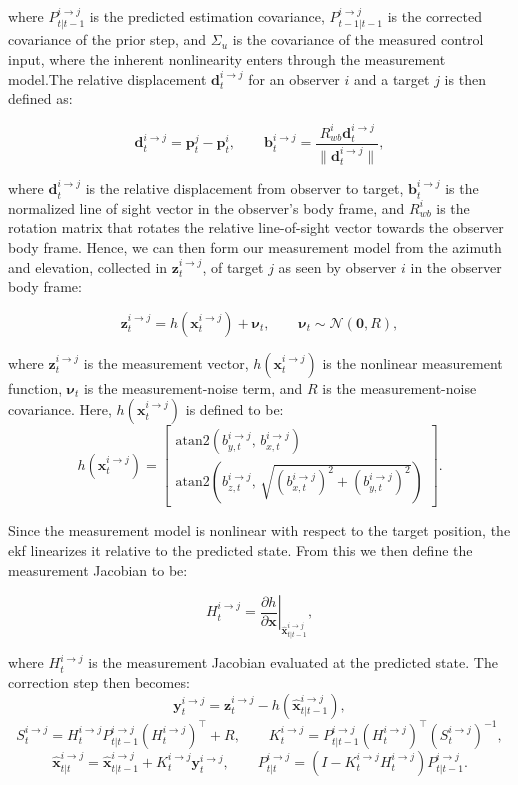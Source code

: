 where  $P^{i\to j}_{t|t-1}$ is the predicted estimation covariance, $P^{i\to j}_{t-1|t-1}$ is the corrected covariance of the prior step, and $\Sigma_u$ is the covariance of the measured control input, where the inherent nonlinearity enters through the measurement model.The relative displacement $\mathbf{d}^{i\to j}_t$ for an observer $i$ and a target $j$ is then defined as: 

\[
\mathbf{d}^{i\to j}_t = \mathbf{p}^j_t - \mathbf{p}^i_t,
\qquad
\mathbf{b}^{i\to j}_t = \frac{R^i_{wb}\mathbf{d}^{i\to j}_t}{\|\mathbf{d}^{i\to j}_t\|},
\]

where $\mathbf{d}^{i\to j}_t$ is the relative displacement from observer to target, $\mathbf{b}^{i\to j}_t$ is the normalized line of sight vector in the observer's body frame, and $R^i_{wb}$ is the rotation matrix that rotates the relative line-of-sight vector towards the observer body frame. Hence, we can then form our measurement model from the azimuth and elevation, collected in $\mathbf{z}^{i\to j}_t$, of target $j$ as seen by observer $i$ in the observer body frame:

\[
\mathbf{z}^{i\to j}_t =
h(\mathbf{x}^{i\to j}_t) + \mathbf{\nu}_t,
\qquad
\mathbf{\nu}_t \sim \mathcal{N}(\mathbf{0},R),
\]

where $\mathbf{z}^{i\to j}_t$ is the measurement vector, $h(\mathbf{x}^{i\to j}_t)$ is the nonlinear measurement function, $\mathbf{\nu}_t$ is the measurement-noise term, and $R$ is the measurement-noise covariance. Here, $h(\mathbf{x}^{i\to j}_t)$ is defined to be:
\[
h(\mathbf{x}^{i\to j}_t)=
\begin{bmatrix}
\mathrm{atan2}(b^{i\to j}_{y,t},\,b^{i\to j}_{x,t})\\[4pt]
\mathrm{atan2}\!\left(b^{i\to j}_{z,t},\,\sqrt{(b^{i\to j}_{x,t})^2+(b^{i\to j}_{y,t})^2}\right)
\end{bmatrix}.
\]

Since the measurement model is nonlinear with respect to the target position, the \acs{ekf} linearizes it relative to the predicted state. From this we then define the measurement Jacobian to be:

\[
H^{i\to j}_t = \left.\frac{\partial h}{\partial \mathbf{x}}\right|_{\hat{\mathbf{x}}^{i\to j}_{t|t-1}},
\]

where $H^{i\to j}_t$ is the measurement Jacobian evaluated at the predicted state. The correction step then becomes:
\[
\mathbf{y}^{i\to j}_t = \mathbf{z}^{i\to j}_t - h(\hat{\mathbf{x}}^{i\to j}_{t|t-1}),
\]
\[
S^{i\to j}_t = H^{i\to j}_t P^{i\to j}_{t|t-1}(H^{i\to j}_t)^\top + R,
\qquad
K^{i\to j}_t = P^{i\to j}_{t|t-1}(H^{i\to j}_t)^\top (S^{i\to j}_t)^{-1},
\]
\[
\hat{\mathbf{x}}^{i\to j}_{t|t} =
\hat{\mathbf{x}}^{i\to j}_{t|t-1} + K^{i\to j}_t\mathbf{y}^{i\to j}_t,
\qquad
P^{i\to j}_{t|t} =
(I - K^{i\to j}_t H^{i\to j}_t)P^{i\to j}_{t|t-1}.
\]

